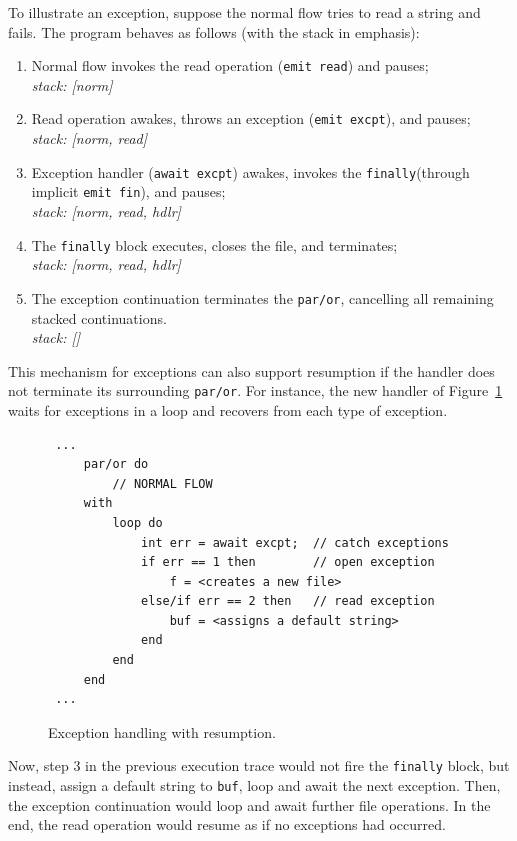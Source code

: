 \documentclass[preprint]{sigplanconf}
\newcommand{\code}[1] {{\small{\texttt{#1}}}}
\newcommand{\FIN}{\code{finally}\xspace}
\newcommand{\1}{\;}
\newcommand{\2}{\;\;}
\newcommand{\3}{\;\;\;}
\newcommand{\5}{\;\;\;\;\;}
\begin{document}
To illustrate an exception, suppose the normal flow tries to read a string and 
fails.
The program behaves as follows (with the stack in emphasis):

{\small
\begin{enumerate}
\setlength{\itemsep}{0pt}
\item Normal flow invokes the read operation (\code{emit read}) and pauses;\\
    \emph{stack: [norm]}
\item Read operation awakes, throws an exception (\code{emit excpt}), and 
    pauses;\\
    \emph{stack: [norm, read]}
\item Exception handler (\code{await excpt}) awakes, invokes the \FIN (through 
    implicit \code{emit fin}), and pauses;\\
    \emph{stack: [norm, read, hdlr]}
\item The \FIN block executes, closes the file, and terminates;\\
    \emph{stack: [norm, read, hdlr]}
\item The exception continuation terminates the \code{par/or}, cancelling all 
remaining stacked continuations.\\
    \emph{stack: []}
\end{enumerate}
}

This mechanism for exceptions can also support resumption if the handler does 
not terminate its surrounding \code{par/or}.
For instance, the new handler of Figure~\ref{lst:excpt3} waits for exceptions 
in a loop and recovers from each type of exception.

\begin{figure}[t]
{\small
\begin{verbatim}
 ...
     par/or do
         // NORMAL FLOW
     with
         loop do
             int err = await excpt;  // catch exceptions
             if err == 1 then        // open exception
                 f = <creates a new file>
             else/if err == 2 then   // read exception
                 buf = <assigns a default string>
             end
         end
     end
 ...
\end{verbatim}
}%
\caption{ Exception handling with resumption.
\label{lst:excpt3}
}
\end{figure}

Now, step 3 in the previous execution trace would not fire the \FIN block, but 
instead, assign a default string to \code{buf}, loop and await the next 
exception.
Then, the exception continuation would loop and await further file operations.
In the end, the read operation would resume as if no exceptions had occurred.
\end{document}
